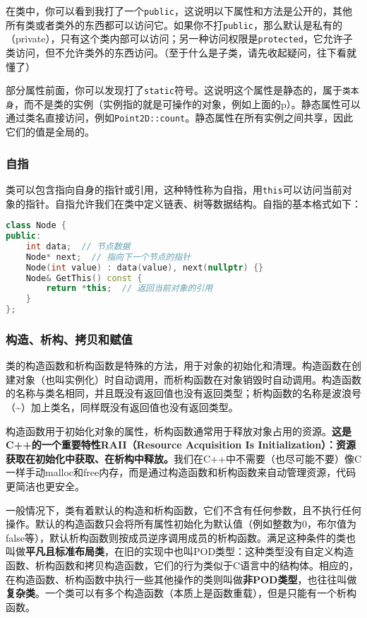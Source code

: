 在类中，你可以看到我打了一个\texttt{public}，这说明以下属性和方法是公开的，其他所有类或者类外的东西都可以访问它。如果你不打\texttt{public}，那么默认是私有的（private），只有这个类内部可以访问；另一种访问权限是\texttt{protected}，它允许子类访问，但不允许类外的东西访问。（至于什么是子类，请先收起疑问，往下看就懂了）

部分属性前面，你可以发现打了\texttt{static}符号。这说明这个属性是静态的，属于\texttt{类本身}，而不是类的实例（实例指的就是可操作的对象，例如上面的p）。静态属性可以通过类名直接访问，例如\texttt{Point2D::count}。静态属性在所有实例之间共享，因此它们的值是全局的。

\subsubsection{自指}

类可以包含指向自身的指针或引用，这种特性称为自指，用\texttt{this}可以访问当前对象的指针。自指允许我们在类中定义链表、树等数据结构。自指的基本格式如下：
\begin{lstlisting}[language=C++]
class Node {
public:
    int data;  // 节点数据
    Node* next;  // 指向下一个节点的指针
    Node(int value) : data(value), next(nullptr) {}
    Node& GetThis() const {
        return *this;  // 返回当前对象的引用
    }
};
\end{lstlisting}

\subsubsection{构造、析构、拷贝和赋值}

类的构造函数和析构函数是特殊的方法，用于对象的初始化和清理。构造函数在创建对象（也叫实例化）时自动调用，而析构函数在对象销毁时自动调用。构造函数的名称与类名相同，并且既没有返回值也没有返回类型；析构函数的名称是波浪号（\textasciitilde）加上类名，同样既没有返回值也没有返回类型。

构造函数用于初始化对象的属性，析构函数通常用于释放对象占用的资源。\textbf{这是C++的一个重要特性RAII（Resource Acquisition Is Initialization）：资源获取在初始化中获取、在析构中释放。}我们在C++中不需要（也尽可能不要）像C一样手动malloc和free内存，而是通过构造函数和析构函数来自动管理资源，代码更简洁也更安全。

一般情况下，类有着默认的构造和析构函数，它们不含有任何参数，且不执行任何操作。默认的构造函数只会将所有属性初始化为默认值（例如整数为0，布尔值为false等），默认析构函数则按成员逆序调用成员的析构函数。满足这种条件的类也叫做\textbf{平凡且标准布局类}，在旧的实现中也叫POD类型：这种类型没有自定义构造函数、析构函数和拷贝构造函数，它们的行为类似于C语言中的结构体。相应的，在构造函数、析构函数中执行一些其他操作的类则叫做\textbf{非POD类型}，也往往叫做\textbf{复杂类}。一个类可以有多个构造函数（本质上是函数重载），但是只能有一个析构函数。

